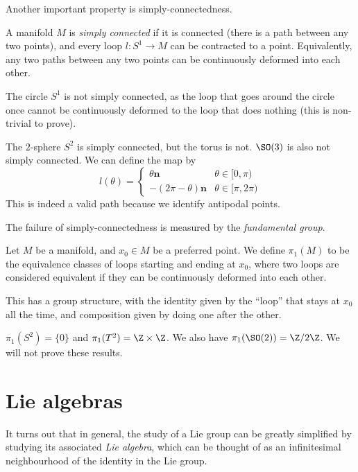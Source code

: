 \documentclass[a4paper]{article}
\begin{document}
Another important property is simply-connectedness.
\begin{defi}
  A manifold $M$ is \emph{simply connected} if it is connected (there is a path between any two points), and every loop $l: S^1 \to M$ can be contracted to a point. Equivalently, any two paths between any two points can be continuously deformed into each other.
\end{defi}

\begin{eg}
  The circle $S^1$ is not simply connected, as the loop that goes around the circle once cannot be continuously deformed to the loop that does nothing (this is non-trivial to prove).
\end{eg}

\begin{eg}
  The $2$-sphere $S^2$ is simply connected, but the torus is not. $\SO(3)$ is also not simply connected. We can define the map by
  \[
    l(\theta) =
    \begin{cases}
      \theta \mathbf{n} & \theta \in [0, \pi)\\
      -(2\pi - \theta) \mathbf{n} & \theta \in [\pi, 2\pi)
    \end{cases}
  \]
  This is indeed a valid path because we identify antipodal points.
\end{eg}

The failure of simply-connectedness is measured by the \emph{fundamental group}.
\begin{defi}
  Let $M$ be a manifold, and $x_0 \in M$ be a preferred point. We define $\pi_1(M)$ to be the equivalence classes of loops starting and ending at $x_0$, where two loops are considered equivalent if they can be continuously deformed into each other.

  This has a group structure, with the identity given by the ``loop'' that stays at $x_0$ all the time, and composition given by doing one after the other.
\end{defi}

\begin{eg}
  $\pi_1(S^2) = \{0\}$ and $\pi_1(T^2) = \Z \times \Z$. We also have $\pi_1(\SO(2)) = \Z/2\Z$. We will not prove these results.
\end{eg}


\section{Lie algebras}
It turns out that in general, the study of a Lie group can be greatly simplified by studying its associated \emph{Lie algebra}, which can be thought of as an infinitesimal neighbourhood of the identity in the Lie group.
\end{document}
